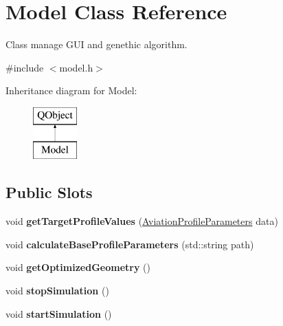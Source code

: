 \hypertarget{class_model}{}\section{Model Class Reference}
\label{class_model}


Class manage G\+UI and genethic algorithm.  




{\ttfamily \#include $<$model.\+h$>$}

Inheritance diagram for Model\+:\begin{figure}[H]
\begin{center}
\leavevmode
\includegraphics[height=2.000000cm]{class_model}
\end{center}
\end{figure}
\subsection*{Public Slots}
\begin{DoxyCompactItemize}
\item 
\mbox{\label{class_model_a61c13cae7083b057b444fcf40494e8c9}} 
void {\bfseries get\+Target\+Profile\+Values} (\hyperlink{struct_aviation_profile_parameters}{Aviation\+Profile\+Parameters} data)
\item 
\mbox{\label{class_model_a3c060dfaec8c6d145356f6126f2859c4}} 
void {\bfseries calculate\+Base\+Profile\+Parameters} (std\+::string path)
\item 
\mbox{\label{class_model_a74ab64a55f20be50aeeaf27f8c6cfea8}} 
void {\bfseries get\+Optimized\+Geometry} ()
\item 
\mbox{\label{class_model_a6452e846a5e560220236b7a59f1dd84b}} 
void {\bfseries stop\+Simulation} ()
\item 
\mbox{\label{class_model_a6fd6613a5141552a6493eb3a840cde24}} 
void {\bfseries start\+Simulation} ()
\end{DoxyCompactItemize}
